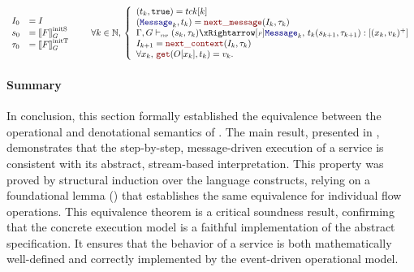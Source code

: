 \begin{skippableproof}
    \begin{equation*}
        \begin{array}{ll}
            I_0    & = I             \\
            s_0    & = \initstate{F} \\
            \tau_0 & = \inittimer{F} \\
        \end{array} \qquad
        \forall k \in \N, \,
        \left\{
        \begin{array}{ll}
            (t_k, \true) = \tck[k]                                                         \\
            (\mess_k, t_k) = \nextMess{I_k}{\tau_k}                                        \\
            \serviceOpSem{s_k}{\tau_k}{F}{\mess_k}{t_k}{s_{k+1}}{\tau_{k+1}}{(x_k, v_k)^+} \\
            I_{k+1} = \nextContext{I_k}{\tau_k}                                            \\
            \forall x_k, \, \getAt{O[x_k]}{t_k}=v_k.
        \end{array}
        \right.
    \end{equation*}

    \setcounter{paragraph}{0}
\end{skippableproof}

\paragraph{Summary}
In conclusion, this section formally established the equivalence between the operational and
denotational semantics of \GRFRP.
%
The main result, presented in , demonstrates that the
step-by-step, message-driven execution of a service is consistent with its abstract, stream-based
interpretation.
%
This property was proved by structural induction over the language constructs, relying on a
foundational lemma () that establishes the
same equivalence for individual flow operations.
%
This equivalence theorem is a critical soundness result, confirming that the concrete execution
model is a faithful implementation of the abstract specification. It ensures that the behavior of a
service is both mathematically well-defined and correctly implemented by the event-driven
operational model.
